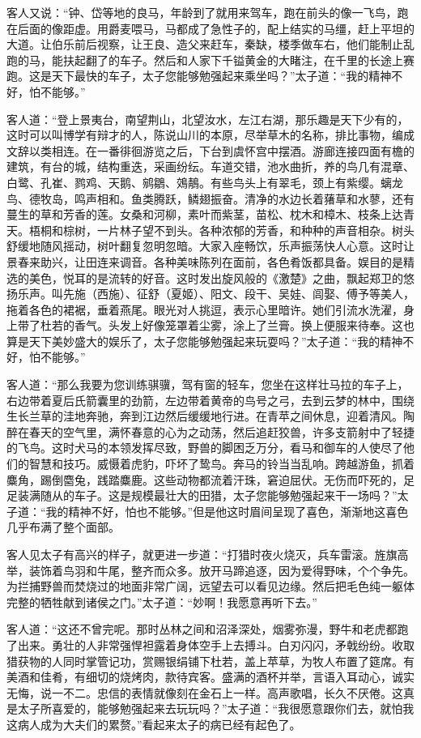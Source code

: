 客人又说：“钟、岱等地的良马，年龄到了就用来驾车，跑在前头的像一飞鸟，跑在后面的像距虚。用爵麦喂马，马都成了急性子的，配上结实的马缰，赶上平坦的大道。让伯乐前后视察，让王良、造父来赶车，秦缺，楼季做车右，他们能制止乱跑的马，能扶起翻了的车子。然后和人家下千镒黄金的大睹注，在千里的长途上赛跑。这是天下最快的车子，太子您能够勉强起来乘坐吗？”太子道：“我的精神不好，怕不能够。”

客人道：“登上景夷台，南望荆山，北望汝水，左江右湖，那乐趣是天下少有的，这时可以叫博学有辩才的人，陈说山川的本原，尽举草木的名称，排比事物，编成文辞以类相连。在一番徘徊游览之后，下台到虞怀宫中摆酒。游廊连接四面有檐的建筑，有台的城，结构重迭，采画纷纭。车道交错，池水曲折，养的鸟几有混章、白鹭、孔崔、鹨鸡、天鹅、鹓鶵、鵁鶄。有些鸟头上有翠毛，颈上有紫缨。螭龙鸟、德牧岛，鸣声相和。鱼类腾跃，鳞翅振奋。清净的水边长着蕏草和水蓼，还有蔓生的草和芳香的莲。女桑和河柳，素叶而紫茎，苗松、枕木和樟木、枝条上达青天。梧桐和棕树，一片林子望不到头。各种浓郁的芳香，和种种的声音相杂。树头舒缓地随风摇动，树叶翻复忽明忽暗。大家入座畅饮，乐声振荡快人心意。这时让景春来助兴，让田连来调音。各种美味陈列在面前，各色肴饭都具备。娱目的是精选的美色，悦耳的是流转的好音。这时发出旋风般的《激楚》之曲，飘起郑卫的悠扬乐声。叫先施（西施）、征舒（夏姬）、阳文、段干、吴娃、闾娶、傅予等美人，拖着各色的裙裾，垂着燕尾。眼光对人挑逗，表示心里暗许。她们引流水洗濯，身上带了杜若的香气。头发上好像笼罩着尘雾，涂上了兰膏。换上便服来待奉。这也算是天下美妙盛大的娱乐了，太子您能够勉强起来玩耍吗？”太子道：“我的精神不好，怕不能够。”

客人道：“那么我要为您训练骐骥，驾有窗的轻车，您坐在这样壮马拉的车子上，右边带着夏后氏箭囊里的劲箭，左边带着黄帝的鸟号之弓，去到云梦的林中，围绕生长兰草的洼地奔驰，奔到江边然后缓缓地行进。在青苹之间休息，迎着清风。陶醉在春天的空气里，满怀春意的心为之动荡，然后追赶狡兽，许多支箭射中了轻捷的飞鸟。这时犬马的本领发挥尽致，野兽的脚困乏万分，看马和御车的人使尽了他们的智慧和技巧。威慑着虎豹，吓坏了鸷鸟。奔马的铃当当乱响。跨越游鱼，抓着麋角，踢倒麕兔，践踏麋鹿。这些动物都流着汗珠，窘迫屈伏。无伤而吓死的，足足装满随从的车子。这是规模最壮大的田猎，太子您能够勉强起来干一场吗？”太子道：“我的精神不好，怕也不能够。”但是他这时眉间呈现了喜色，渐渐地这喜色几乎布满了整个面部。

客人见太子有高兴的样子，就更进一步道：“打猎时夜火烧灭，兵车雷滚。旌旗高举，装饰着鸟羽和牛尾，整齐而众多。放开马蹄追逐，因为爱得野味，个个争先。为拦捕野兽而焚烧过的地面非常广阔，远望去可以看见边缘。然后把毛色纯一躯体完整的牺牲献到诸侯之门。”太子道：“妙啊！我愿意再听下去。”


客人道：“这还不曾完呢。那时丛林之间和沼泽深处，烟雾弥漫，野牛和老虎都跑了出来。勇壮的人非常强悍袒露着身体空手上去搏斗。白刃闪闪，矛戟纷纷。收取猎获物的人同时掌管记功，赏赐银绢铺下杜若，盖上苹草，为牧人布置了筵席。有美酒和佳肴，有细切的烧烤肉，款待宾客。盛满的酒杯并举，言语入耳动心，诚实无悔，说一不二。忠信的表情就像刻在金石上一样。高声歌唱，长久不厌倦。这真是太子所喜爱的，能够勉强起来去玩玩吗？”太子道：“我很愿意跟你们去，就怕我这病人成为大夫们的累赘。”看起来太子的病已经有起色了。


